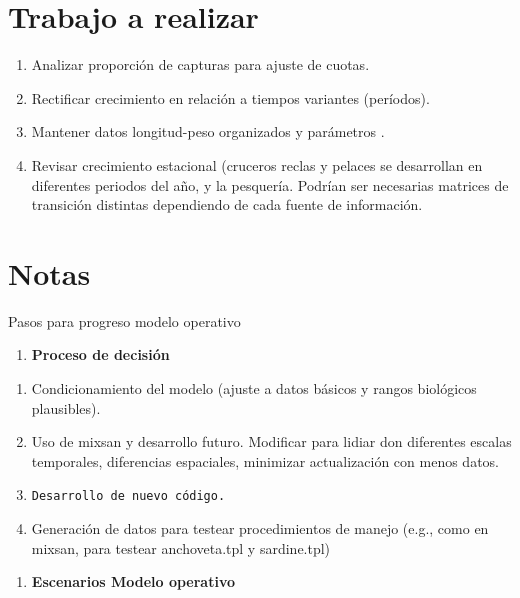 \documentclass[]{article}
\providecommand{\tightlist}{%
  \setlength{\itemsep}{0pt}\setlength{\parskip}{0pt}}
\begin{document}
\section{Trabajo a realizar}\label{trabajo-a-realizar}

\begin{enumerate}
\def\labelenumi{\arabic{enumi}.}
\item
  Analizar proporción de capturas para ajuste de cuotas.
\item
  Rectificar crecimiento en relación a tiempos variantes (períodos).
\item
  Mantener datos longitud-peso organizados y parámetros .
\item
  Revisar crecimiento estacional (cruceros reclas y pelaces se
  desarrollan en diferentes periodos del año, y la pesquería. Podrían
  ser necesarias matrices de transición distintas dependiendo de cada
  fuente de información.
\end{enumerate}

\section{Notas}\label{notas}

Pasos para progreso modelo operativo

\begin{enumerate}
\def\labelenumi{\arabic{enumi})}
\tightlist
\item
  \textbf{Proceso de decisión}
\end{enumerate}

\begin{enumerate}
\def\labelenumi{\roman{enumi}.}
\item
  Condicionamiento del modelo (ajuste a datos básicos y rangos
  biológicos plausibles).
\item
  Uso de mixsan y desarrollo futuro. Modificar para lidiar don
  diferentes escalas temporales, diferencias espaciales, minimizar
  actualización con menos datos.
\item
\begin{verbatim}
Desarrollo de nuevo código.
\end{verbatim}
\item
  Generación de datos para testear procedimientos de manejo (e.g., como
  en mixsan, para testear anchoveta.tpl y sardine.tpl)
\end{enumerate}

\begin{enumerate}
\def\labelenumi{\arabic{enumi})}
\setcounter{enumi}{1}
\tightlist
\item
  \textbf{Escenarios Modelo operativo}
\end{enumerate}
\end{document}
